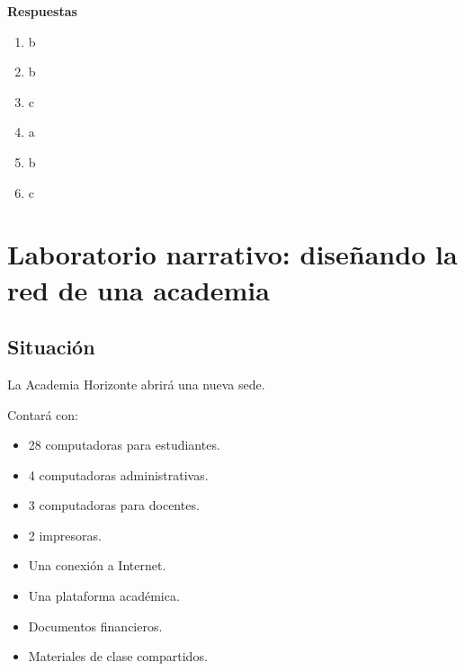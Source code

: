 \documentclass[
  spanish,
  letterpaper,
]{scrbook}
\providecommand{\tightlist}{%
  \setlength{\itemsep}{0pt}\setlength{\parskip}{0pt}}
\begin{document}
\begin{tcolorbox}[enhanced jigsaw, arc=.35mm, bottomrule=.15mm, breakable, colback=white, colframe=quarto-callout-note-color-frame, left=2mm, leftrule=.75mm, opacityback=0, rightrule=.15mm, toprule=.15mm]
\begin{minipage}[t]{5.5mm}
\textcolor{quarto-callout-note-color}{\faInfo}
\end{minipage}%
\begin{minipage}[t]{\textwidth - 5.5mm}

\vspace{-3mm}\textbf{Respuestas}\vspace{3mm}

\begin{enumerate}
\def\labelenumi{\arabic{enumi}.}
\tightlist
\item
  b\\
\item
  b\\
\item
  c\\
\item
  a\\
\item
  b\\
\item
  c
\end{enumerate}

\end{minipage}%
\end{tcolorbox}


\chapter{Laboratorio narrativo: diseñando la red de una
academia}\label{laboratorio-narrativo-diseuxf1ando-la-red-de-una-academia}

\section{Situación}\label{situaciuxf3n-1}

La Academia Horizonte abrirá una nueva sede.

Contará con:

\begin{itemize}
\tightlist
\item
  28 computadoras para estudiantes.
\item
  4 computadoras administrativas.
\item
  3 computadoras para docentes.
\item
  2 impresoras.
\item
  Una conexión a Internet.
\item
  Una plataforma académica.
\item
  Documentos financieros.
\item
  Materiales de clase compartidos.
\end{itemize}
\end{document}
